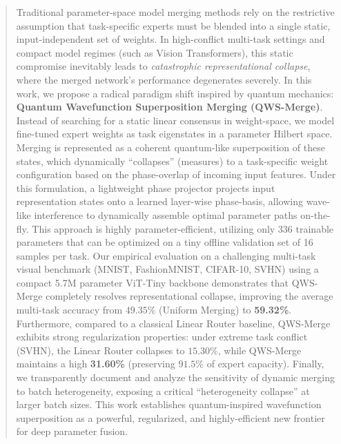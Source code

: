 \begin{abstract}
Traditional parameter-space model merging methods rely on the restrictive assumption that task-specific experts must be blended into a single static, input-independent set of weights. In high-conflict multi-task settings and compact model regimes (such as Vision Transformers), this static compromise inevitably leads to \emph{catastrophic representational collapse}, where the merged network's performance degenerates severely. In this work, we propose a radical paradigm shift inspired by quantum mechanics: \textbf{Quantum Wavefunction Superposition Merging (QWS-Merge)}. Instead of searching for a static linear consensus in weight-space, we model fine-tuned expert weights as task eigenstates in a parameter Hilbert space. Merging is represented as a coherent quantum-like superposition of these states, which dynamically ``collapses'' (measures) to a task-specific weight configuration based on the phase-overlap of incoming input features. Under this formulation, a lightweight phase projector projects input representation states onto a learned layer-wise phase-basis, allowing wave-like interference to dynamically assemble optimal parameter paths on-the-fly. This approach is highly parameter-efficient, utilizing only 336 trainable parameters that can be optimized on a tiny offline validation set of 16 samples per task. Our empirical evaluation on a challenging multi-task visual benchmark (MNIST, FashionMNIST, CIFAR-10, SVHN) using a compact 5.7M parameter ViT-Tiny backbone demonstrates that QWS-Merge completely resolves representational collapse, improving the average multi-task accuracy from $49.35\%$ (Uniform Merging) to \textbf{59.32\%}. Furthermore, compared to a classical Linear Router baseline, QWS-Merge exhibits strong regularization properties: under extreme task conflict (SVHN), the Linear Router collapses to $15.30\%$, while QWS-Merge maintains a high \textbf{31.60\%} (preserving $91.5\%$ of expert capacity). Finally, we transparently document and analyze the sensitivity of dynamic merging to batch heterogeneity, exposing a critical ``heterogeneity collapse'' at larger batch sizes. This work establishes quantum-inspired wavefunction superposition as a powerful, regularized, and highly-efficient new frontier for deep parameter fusion.
\end{abstract}
